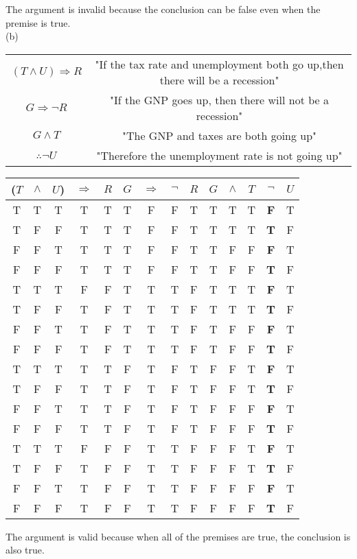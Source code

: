 \documentclass{article}
\begin{document}
 The argument is invalid because the conclusion can be false even when the premise is true.\\
 \newline
 (b) 
 \begin{tabular}{cc}
 $(T \wedge U)\Rightarrow R$&"If the tax rate and unemployment both go up,then there will be a recession"\\
 $G \Rightarrow \neg R$&"If the GNP goes up, then there will not be a recession"\\
 $G \wedge T$&"The  GNP and taxes are both going up"\\
 \hline
 $\therefore \neg U$&"Therefore the unemployment rate is not going up"\\
 \end{tabular}
 \vspace{2em}
 \linebreak
 \begin{tabular}{cccccccccccccc}
 ($T$&$\wedge$&$U$)&$\Rightarrow$&$R$&$G$&$\Rightarrow$&$\neg$&$R$&$G$&$\wedge$&$T$&$\neg$&$U$\\
 \hline
 T&T&T&T&T&T&F&F&T&T&T&T&\textbf{F}&T\\
 T&F&F&T&T&T&F&F&T&T&T&T&\textbf{T}&F\\
 F&F&T&T&T&T&F&F&T&T&F&F&\textbf{F}&T\\
 F&F&F&T&T&T&F&F&T&T&F&F&\textbf{T}&F\\
 T&T&T&F&F&T&T&T&F&T&T&T&\textbf{F}&T\\
 T&F&F&T&F&T&T&T&F&T&T&T&\textbf{T}&F\\
 F&F&T&T&F&T&T&T&F&T&F&F&\textbf{F}&T\\
 F&F&F&T&F&T&T&T&F&T&F&F&\textbf{T}&F\\
 T&T&T&T&T&F&T&F&T&F&F&T&\textbf{F}&T\\
 T&F&F&T&T&F&T&F&T&F&F&T&\textbf{T}&F\\
 F&F&T&T&T&F&T&F&T&F&F&F&\textbf{F}&T\\
 F&F&F&T&T&F&T&F&T&F&F&F&\textbf{T}&F\\
 T&T&T&F&F&F&T&T&F&F&F&T&\textbf{F}&T\\
 T&F&F&T&F&F&T&T&F&F&F&T&\textbf{T}&F\\
 F&F&T&T&F&F&T&T&F&F&F&F&\textbf{F}&T\\
 F&F&F&T&F&F&T&T&F&F&F&F&\textbf{T}&F\\
 \end{tabular}
  \vspace{2em}
  \linebreak
  The argument is valid because when all of the premises are true, the conclusion is also true.\\
\end{document}

